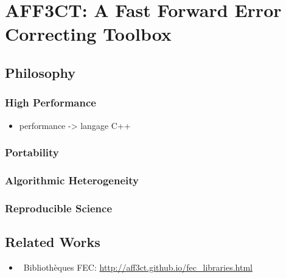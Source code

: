 \graphicspath{{main/chapter4/fig/}}

\chapter{AFF3CT: A Fast Forward Error Correcting Toolbox}

\minitoccustom

\section{Philosophy~\cite{Cassagne2019a}}

\subsection{High Performance}

\begin{itemize}
  \item performance -> langage C++
\end{itemize}

\subsection{Portability}

\subsection{Algorithmic Heterogeneity}

\subsection{Reproducible Science}

\section{Related Works}

\begin{itemize}
  \item \cmark~Bibliothèques FEC: \url{http://aff3ct.github.io/fec_libraries.html}
\end{itemize}

